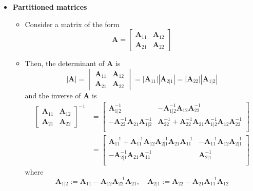 \documentclass[12pt,a4paper]{article}
\begin{document}
\begin{itemize}
\item \textbf{Partitioned matrices}
  
  \begin{itemize}

  \item Consider a matrix of the form
    \begin{equation}\nonumber%
      \bm{A} = 
      \begin{bmatrix}
        \bm{A}_{11}&\bm{A}_{12}\\
        \bm{A}_{21}&\bm{A}_{22}
      \end{bmatrix}
    \end{equation}

  \item Then,
    the determinant of $\bm{A}$ is
    \begin{equation}\nonumber%
      |\bm{A}|
      =
      \begin{vmatrix}
        \bm{A}_{11}&\bm{A}_{12}\\
        \bm{A}_{21}&\bm{A}_{22}\end{vmatrix}
      = |\bm{A}_{11}||\bm{A}_{2|1}|
      = |\bm{A}_{22}||\bm{A}_{1|2}|
    \end{equation}
    and the inverse of $\bm{A}$ is
    \begin{align}\nonumber%
      \begin{bmatrix}
        \bm{A}_{11}&\bm{A}_{12}\\
        \bm{A}_{21}&\bm{A}_{22}
      \end{bmatrix}^{-1}
      & =
      \begin{bmatrix}
        \bm{A}_{1|2}^{-1} & -\bm{A}_{1|2}^{-1}\bm{A}_{12}\bm{A}_{22}^{-1} \\
        - \bm{A}_{22}^{-1}\bm{A}_{21}\bm{A}_{1|2}^{-1} & \bm{A}_{22}^{-1} + \bm{A}_{22}^{-1}\bm{A}_{21}\bm{A}_{1|2}^{-1}\bm{A}_{12}\bm{A}_{22}^{-1} \\
      \end{bmatrix}\\
      & =
      \begin{bmatrix}
        \bm{A}_{11}^{-1} + \bm{A}_{11}^{-1}\bm{A}_{12}\bm{A}_{2|1}^{-1}\bm{A}_{21}\bm{A}_{11}^{-1} & - \bm{A}_{11}^{-1}\bm{A}_{12}\bm{A}_{2|1}^{-1} \\
        -\bm{A}_{2|1}^{-1}\bm{A}_{21}\bm{A}_{11}^{-1} & \bm{A}_{2|1}^{-1} \\
      \end{bmatrix}
      \nonumber
    \end{align}
    where
    \begin{equation}\nonumber%
      \bm{A}_{1|2}:=\bm{A}_{11}- \bm{A}_{12}\bm{A}_{22}^{-1}\bm{A}_{21},
      \quad
      \bm{A}_{2|1}:=\bm{A}_{22}- \bm{A}_{21}\bm{A}_{11}^{-1}\bm{A}_{12}
    \end{equation}
  \end{itemize}


\end{itemize}
\end{document}
